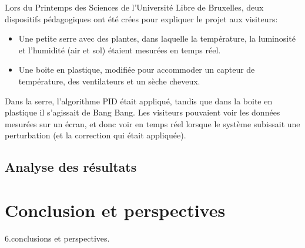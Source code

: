 \documentclass[a4paper,10pt]{report}
\begin{document}

Lors du Printemps des Sciences de l'Université Libre de Bruxelles, deux dispositifs pédagogiques ont été crées pour expliquer le projet aux visiteurs:

\begin{itemize}
\item Une petite serre avec des plantes, dans laquelle la température, la luminosité et l'humidité (air et sol) étaient mesurées en temps réel.
\item Une boite en plastique, modifiée pour accommoder un capteur de température, des ventilateurs et un sèche cheveux.
\end{itemize}

Dans la serre, l'algorithme PID était appliqué, tandis que dans la boite en plastique il s'agissait de Bang Bang. Les visiteurs pouvaient voir les données mesurées sur un écran, et donc voir en temps réel lorsque le système subissait une perturbation (et la correction qui était appliquée).

\section{Analyse des résultats}

\chapter{Conclusion et perspectives}
6.conclusions et perspectives.




\end{document}
